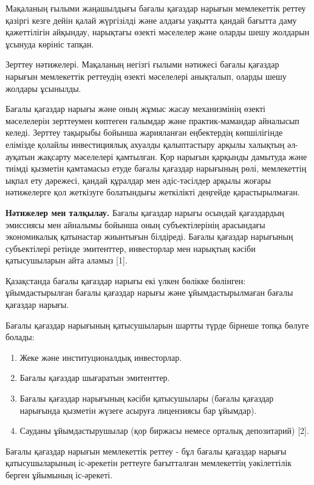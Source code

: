 Мақаланың ғылыми жаңашылдығы бағалы қағаздар нарығын мемлекеттік реттеу
қазіргі кезге дейін қалай жүргізілді және алдағы уақытта қандай бағытта
даму қажеттілігін айқындау, нарықтағы өзекті мәселелер және оларды шешу
жолдарын ұсынуда көрініс тапқан.

Зерттеу нәтижелері. Мақаланың негізгі ғылыми нәтижесі бағалы қағаздар
нарығын мемлекеттік реттеудің өзекті мәселелері анықталып, оларды шешу
жолдары ұсынылды.

Бағалы қағаздар нарығы және оның жұмыс жасау механизмінің өзекті
мәселелерін зерттеумен көптеген ғалымдар және практик-мамандар айналысып
келеді. Зерттеу тақырыбы бойынша жарияланған еңбектердің көпшілігінде
елімізде қолайлы инвестициялық ахуалды қалыптастыру арқылы халықтың
әл-ауқатын жақсарту мәселелері қамтылған. Қор нарығын қарқынды дамытуда
және тиімді қызметін қамтамасыз етуде бағалы қағаздар нарығының рөлі,
мемлекеттің ықпал ету дәрежесі, қандай құралдар мен әдіс-тәсілдер арқылы
жоғары нәтижелерге қол жеткізуге болатындығы жеткілікті деңгейде
қарастырылмаған.

{\bfseries Нәтижелер мен талқылау.} Бағалы қағаздар нарығы осындай
қағаздардың эмиссиясы мен айналымы бойынша оның субъектілерінің
арасындағы экономикалық қатынастар жиынтығын білдіреді. Бағалы қағаздар
нарығының субъектілері ретінде эмитенттер, инвесторлар мен нарықтың
кәсіби қатысушыларын айта аламыз {[}1{]}.

Қазақстанда бағалы қағаздар нарығы екі үлкен бөлікке бөлінген:
ұйымдастырылған бағалы қағаздар нарығы және ұйымдастырылмаған бағалы
қағаздар нарығы.

Бағалы қағаздар нарығының қатысушыларын шартты түрде бірнеше топқа
бөлуге болады:

\begin{enumerate}
\def\labelenumi{\arabic{enumi}.}
\item
  Жеке және институционалдық инвесторлар.
\item
  Бағалы қағаздар шығаратын эмитенттер.
\item
  Бағалы қағаздар нарығының кәсіби қатысушылары (бағалы қағаздар
  нарығында қызметін жүзеге асыруға лицензиясы бар ұйымдар).
\item
  Сауданы ұйымдастырушылар (қор биржасы немесе орталық депозитарий)
  {[}2{]}.
\end{enumerate}

Бағалы қағаздар нарығын мемлекеттік реттеу - бұл бағалы қағаздар нарығы
қатысушыларының іс-әрекетін реттеуге бағытталған мемлекеттің
уәкілеттілік берген ұйымының іс-әрекеті.

